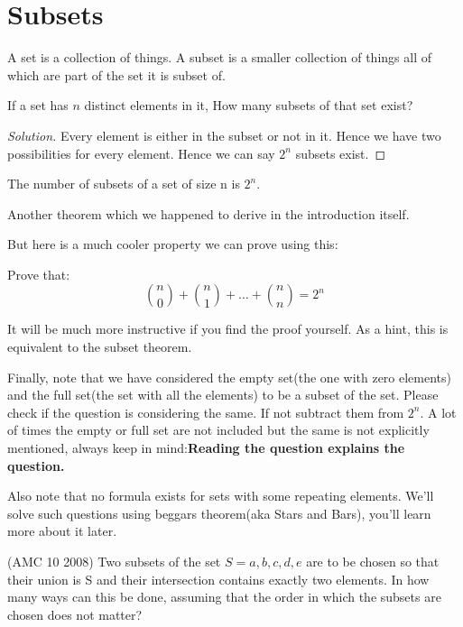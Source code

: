 \section{Subsets}
A set is a collection of things. A subset is a smaller collection of things all of which are 
part of the set it is subset of.
\begin{example}
    If a set has $n$ distinct elements in it, How many subsets of that set exist?
\end{example}
\begin{proof}
    [Solution]
    Every element is either in the subset or not in it. Hence we have two possibilities 
    for every element. Hence we can say $2^n$ subsets exist.
\end{proof}
\begin{theorem}
    The number of subsets of a set of size n is $2^n$.
\end{theorem}
Another theorem which we happened to derive in the introduction itself.\par
But here is a much cooler property we can prove using this:
\begin{example}
    Prove that:
    \[
    \binom{n}{0}+\binom{n}{1}+\dots+\binom{n}{n}=2^n
    \]
\end{example}
It will be much more instructive if you find the proof yourself. As a hint, this is equivalent 
to the subset theorem.\par
Finally, note that we have considered the empty set(the one with zero elements) and the 
full set(the set with all the elements) to be a subset of the set. Please check if the 
question is considering the same. If not subtract them from $2^n$. A lot of times the 
empty or full set are not included but the same is not explicitly mentioned, always keep 
in mind:\textbf{Reading the question explains the question.}\par
Also note that no formula exists for sets with some repeating elements. 
We'll solve such questions using beggars theorem(aka Stars and Bars), you'll 
learn more about it later.
\begin{example}
    (AMC 10 2008) Two subsets of the set $S = {a, b, c, d, e}$ are to be chosen 
    so that their union is S and their intersection contains exactly two elements. 
    In how many ways can this be done, assuming that the order in which the subsets 
    are chosen does not matter?
\end{example}
